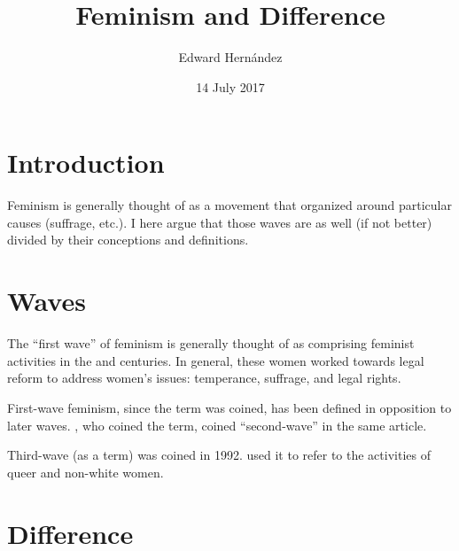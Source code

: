 \documentclass[man,12pt,natbib]{apa6}
\begin{document}
\title{Feminism and Difference}
\author{Edward Hern\'{a}ndez}
\date{14 July 2017}
\maketitle

%
%

\section{Introduction}

Feminism is generally thought of as a movement that organized around particular
causes (suffrage, etc.). I here argue that those waves are as well (if not
better) divided by their conceptions and definitions.

\section{Waves}

The ``first wave'' of feminism is generally thought of as comprising feminist
activities in the  and  centuries. In general, these women
worked towards legal reform to address women's issues: temperance, suffrage,
and legal rights.

First-wave feminism, since the term was coined, has been defined in opposition
to later waves. \citet{Lear68}, who coined the term, coined ``second-wave'' in
the same article.

Third-wave (as a term) was coined in 1992. \citet{Walker92} used it to refer to
the activities of queer and non-white women.

\section{Difference}

\clearpage

\end{document}
